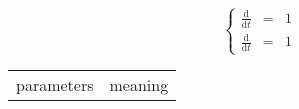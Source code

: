 \documentclass[12pt]{article}
\begin{document}
\begin{equation}
    \left\{
    \begin{array}{lll}
        \frac{\mathrm{d}  }{\mathrm{d}t}  & = &  1\\
        \frac{\mathrm{d}  }{\mathrm{d}t}  & = &  1
    \end{array}\right.
\end{equation}

\begin{table}[H]
    \centering
    \begin{tabular}{cc}
        parameters & meaning \\ 
        
    \end{tabular}
\end{table}
\end{document}
